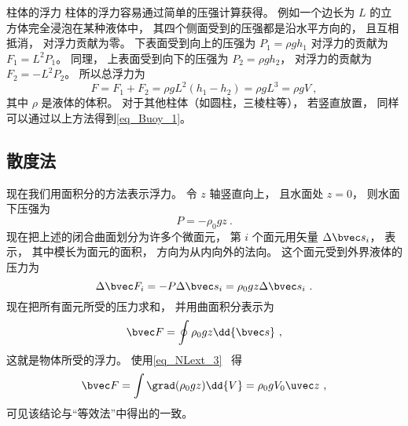 
\begin{example}{柱体的浮力}
柱体的浮力容易通过简单的压强计算获得。 例如一个边长为 $L$ 的立方体完全浸泡在某种液体中， 其四个侧面受到的压强都是沿水平方向的， 且互相抵消， 对浮力贡献为零。 下表面受到向上的压强为 $P_1 = \rho g h_1$ 对浮力的贡献为 $F_1 = L^2 P_1$。 同理， 上表面受到向下的压强为 $P_2 = \rho g h_2$， 对浮力的贡献为 $F_2 = -L^2 P_2$。 所以总浮力为
\begin{equation}
F = F_1 + F_2 = \rho g L^2 (h_1 - h_2) = \rho g L^3 = \rho g V~,
\end{equation}
其中 $\rho$ 是液体的体积。 对于其他柱体（如圆柱，三棱柱等）， 若竖直放置， 同样可以通过以上方法得到\autoref{eq_Buoy_1}。
\end{example}

\subsection{散度法}

现在我们用面积分的方法表示浮力。 令 $z$ 轴竖直向上， 且水面处 $z = 0$， 则水面下压强为
\begin{equation}
P = -\rho_0 g z~.
\end{equation}
现在把上述的闭合曲面划分为许多个微面元， 第 $i$ 个面元用矢量 $\Delta \bvec s_i$， 表示， 其中模长为面元的面积， 方向为从内向外的法向。 这个面元受到外界液体的压力为
\begin{equation}
\Delta \bvec F_i = -P\Delta \bvec s_i = \rho_0 g z \Delta \bvec s_i~.
\end{equation}
现在把所有面元所受的压力求和， 并用曲面积分表示为
\begin{equation}
\bvec F = \oint \rho_0 g z \dd{\bvec s}~,
\end{equation}
这就是物体所受的浮力。 使用\autoref{eq_NLext_3}~ 得
\begin{equation}
\bvec F = \int \grad(\rho_0 g z) \dd{V} = \rho_0 g V_0 \uvec z~,
\end{equation}
可见该结论与“等效法”中得出的一致。
